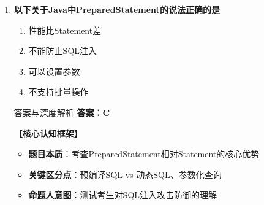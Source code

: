 \documentclass[12pt, a4paper]{ctexart}
\begin{document}
\begin{enumerate}[label=\textbf{\arabic*.}]
\begin{bluebox}{答案与深度解析}
		      \textbf{考场秒杀技巧}：看到SELECT就选executeQuery()，其他情况用executeUpdate()
	      \end{bluebox}

	\item \textbf{以下关于Java中PreparedStatement的说法正确的是}
	      \begin{enumerate}[label=\Alph*.]
		      \item 性能比Statement差
		      \item 不能防止SQL注入
		      \item 可以设置参数
		      \item 不支持批量操作
	      \end{enumerate}

	      \begin{bluebox}{答案与深度解析}
		      \textbf{答案：C}

		      \textbf{【核心认知框架】}
		      \begin{itemize}[label={}, leftmargin=*, nosep]
			      \item \textbf{题目本质}：考查PreparedStatement相对Statement的核心优势
			      \item \textbf{关键区分点}：预编译SQL vs 动态SQL、参数化查询
			      \item \textbf{命题人意图}：测试考生对SQL注入攻击防御的理解
		      \end{itemize}


\end{bluebox}
\end{enumerate}
\end{document}
